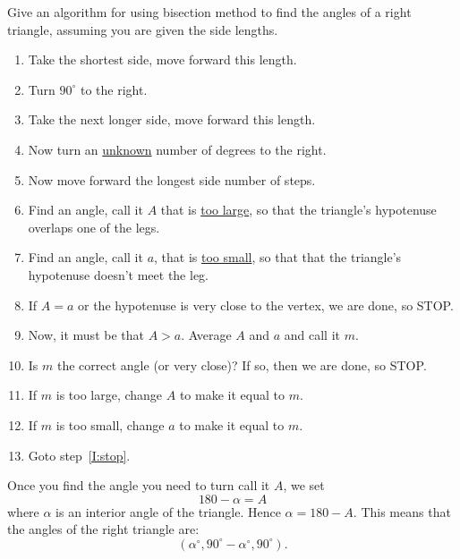 \documentclass[noauthor,nooutcomes,handout,12pt]{ximera}
\begin{document}
\begin{question}
  Give an algorithm for using bisection method to find the angles of a
  right triangle, assuming you are given the side lengths.
  \begin{freeResponse}
    \begin{enumerate}
    \item Take the shortest side, move forward this length.
    \item Turn $90^\circ$ to the right.
    \item Take the next longer side, move forward this length.
    \item Now turn an \underline{unknown} number of degrees to the right.
    \item Now move forward the longest side number of steps.
    \item Find an angle, call it $A$ that is \underline{too large}, so
      that the triangle's hypotenuse overlaps one of the legs.
    \item Find an angle, call it $a$, that is \underline{too small},
      so that that the triangle's hypotenuse doesn't meet the leg.
    \item\label{I:stop} If $A=a$ or the hypotenuse is very close to
      the vertex, we are done, so STOP.
    \item Now, it must be that $A>a$. Average $A$ and $a$ and call it $m$.
    \item Is $m$ the correct angle (or very close)? If so, then we are done, so STOP.
    \item If $m$ is too large, change $A$ to make it equal to $m$.
    \item If $m$ is too small, change $a$ to make it equal to $m$.
    \item Goto step~\ref{I:stop}.
    \end{enumerate}
    Once you find the angle you need to turn call it $A$, we set
    \[
    180-\alpha = A
    \]
    where $\alpha$ is an interior angle of the triangle.  Hence
    $\alpha = 180-A$. This means that the angles of the right triangle
    are:
    \[
    (\alpha^\circ,90^\circ-\alpha^\circ,90^\circ).
    \]
  \end{freeResponse}
\end{question}
\end{document}
